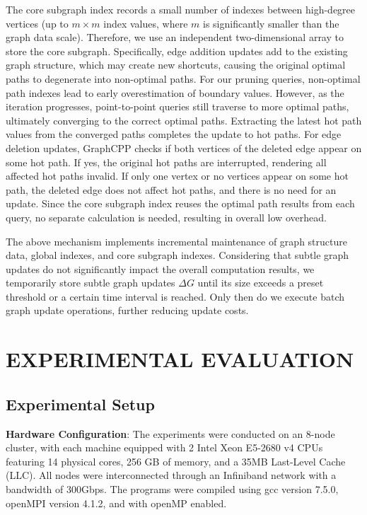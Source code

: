 \documentclass[lettersize,journal]{IEEEtran} %
\begin{document}
The core subgraph index records a small number of indexes between high-degree vertices (up to $m \times m$ index values, where $m$ is significantly smaller than the graph data scale). Therefore, we use an independent two-dimensional array to store the core subgraph. Specifically, edge addition updates add to the existing graph structure, which may create new shortcuts, causing the original optimal paths to degenerate into non-optimal paths. For our pruning queries, non-optimal path indexes lead to early overestimation of boundary values. However, as the iteration progresses, point-to-point queries still traverse to more optimal paths, ultimately converging to the correct optimal paths. Extracting the latest hot path values from the converged paths completes the update to hot paths. For edge deletion updates, GraphCPP checks if both vertices of the deleted edge appear on some hot path. If yes, the original hot paths are interrupted, rendering all affected hot paths invalid. If only one vertex or no vertices appear on some hot path, the deleted edge does not affect hot paths, and there is no need for an update. Since the core subgraph index reuses the optimal path results from each query, no separate calculation is needed, resulting in overall low overhead.

The above mechanism implements incremental maintenance of graph structure data, global indexes, and core subgraph indexes. Considering that subtle graph updates do not significantly impact the overall computation results, we temporarily store subtle graph updates $\Delta G$ until its size exceeds a preset threshold or a certain time interval is reached. Only then do we execute batch graph update operations, further reducing update costs.

\section{EXPERIMENTAL EVALUATION}
\subsection{Experimental Setup}

{\bf{Hardware Configuration}}: The experiments were conducted on an 8-node cluster, with each machine equipped with 2 Intel Xeon E5-2680 v4 CPUs featuring 14 physical cores, 256 GB of memory, and a 35MB Last-Level Cache (LLC). All nodes were interconnected through an Infiniband network with a bandwidth of 300Gbps. The programs were compiled using gcc version 7.5.0, openMPI version 4.1.2, and with openMP enabled.
    
\end{document}
